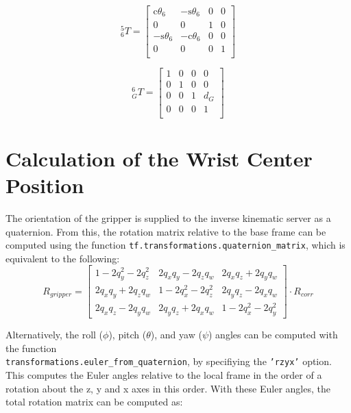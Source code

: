 \documentclass[twoside]{article}
\renewcommand{\c}{\text{c}}
\newcommand{\s}{\text{s}}
\newcommand{\T}[2]{\mbox{$_{#2}^{#1}{T}$}}
\newcommand{\code}[1]{\texttt{#1}}
\begin{document}
\begin{minipage}{0.33\linewidth}
\begin{equation}
\T{5}{6} =
\begin{bmatrix}
  \c\theta_6 & -\s\theta_6 & 0 & 0 \\
           0 &           0 & 1 & 0 \\
 -\s\theta_6 & -\c\theta_6 & 0 & 0 \\
           0 &           0 & 0 & 1 \\
\end{bmatrix}
\end{equation}
\end{minipage}%
\begin{minipage}{0.33\linewidth}
\begin{equation}
\T{6}{G} =
\begin{bmatrix}
  1 & 0 & 0 &   0 \\
  0 & 1 & 0 &   0 \\
  0 & 0 & 1 & d_G \\
  0 & 0 & 0 &   1 \\
\end{bmatrix}
\end{equation}
\end{minipage}%
\begin{minipage}{0.33\linewidth}
\end{minipage}

\section{Calculation of the Wrist Center Position}
The orientation of the gripper is supplied to the inverse kinematic server as a quaternion.
From this, the rotation matrix relative to the base frame can be computed using the function
\code{tf.transformations.quaternion\_matrix}, which is equivalent to the following:
\begin{equation}
  R_{gripper} =
  \begin{bmatrix}
    1 - 2 q_y^2 - 2 q_z^2	& 2 q_x q_y - 2 q_z q_w	& 2 q_x q_z + 2 q_y q_w \\
    2 q_x q_y + 2 q_z q_w	& 1 - 2 q_x^2 - 2 q_z^2	& 2 q_y q_z - 2 q_x q_w \\
    2 q_x q_z - 2 q_y q_w	& 2 q_y q_z + 2 q_x q_w	& 1 - 2 q_x^2 - 2 q_y^2
  \end{bmatrix}
  \cdot R_{corr}
\end{equation}

Alternatively, the roll ($\phi$), pitch ($\theta$), and yaw ($\psi$) angles can be computed with the function
\\ \code{transformations.euler\_from\_quaternion}, by specifiying the \code{'rzyx'} option.
This computes the Euler angles relative to the local frame in the order of a rotation about the
z, y and x axes in this order. With these Euler angles, the total rotation matrix can be computed as:
\end{document}
